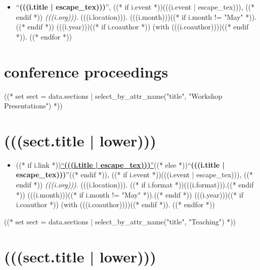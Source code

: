 \documentclass[10pt,oneside]{article}
\begin{document}
\mbox{}\vspace{-\dimexpr\baselineskip\relax}

\begin{itemize}[label={}]
  ((* for i in sect.entries.talks | sort_by_attr(["year"], reverse=True) *))
  \item \enquote{\textbf{(((i.title | escape_tex)))}}, ((* if i.event *))(((i.event | escape_tex))), ((* endif *)) \textit{(((i.org)))}. (((i.location))). (((i.month)))((* if i.month != "May" *)).((* endif *)) (((i.year)))((* if i.coauthor *)) (with (((i.coauthor))))((* endif *)).
        ((* endfor *))
\end{itemize}

\section{\color{BrickRed}conference proceedings}

\mbox{}\vspace{-\dimexpr\baselineskip\relax}
\vspace*{-1em}
\printbibliography[type=inproceedings, heading=none]

((* set sect = data.sections | select_by_attr_name("title", "Workshop Presentations") *))
\section{\color{BrickRed}(((sect.title | lower)))}

\mbox{}\vspace{-\dimexpr\baselineskip\relax}

\begin{itemize}[label={}]
  ((* for i in sect.entries.workshops | sort_by_attr(["year"], reverse=True) *))
  \item ((* if i.link *))\href{(((i.link)))}{\enquote{\textbf{(((i.title | escape_tex)))}}}((* else *))\enquote{\textbf{(((i.title | escape_tex)))}}((* endif *)), ((* if i.event *))(((i.event | escape_tex))), ((* endif *)) \textit{(((i.org)))}. (((i.location))). ((* if i.format *))(((i.format))).((* endif *)) (((i.month)))((* if i.month != "May" *)).((* endif *)) (((i.year)))((* if i.coauthor *)) (with (((i.coauthor))))((* endif *)).
        ((* endfor *))
\end{itemize}

((* set sect = data.sections | select_by_attr_name("title", "Teaching") *))
\section{\color{BrickRed}(((sect.title | lower)))}
\end{document}
